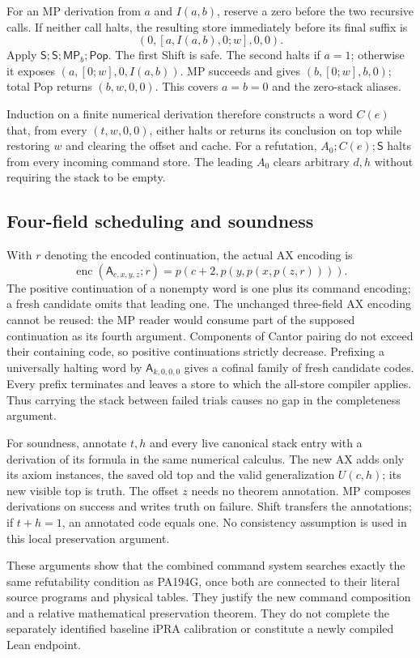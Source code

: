 For an MP derivation from $a$ and $I(a,b)$, reserve a zero before the two
recursive calls. If neither call halts, the resulting store immediately
before its final suffix is
\[
 (0,[a,I(a,b),0;w],0,0).
\]
Apply $\mathsf S;\mathsf S;\mathsf{MP}_b;\mathsf{Pop}$. The first Shift
is safe. The second halts if $a=1$; otherwise it exposes
$(a,[0;w],0,I(a,b))$. MP succeeds and gives $(b,[0;w],b,0)$; total Pop
returns $(b,w,0,0)$. This covers $a=b=0$ and the zero-stack aliases.

Induction on a finite numerical derivation therefore constructs a word
$C(e)$ that, from every $(t,w,0,0)$, either halts or returns its conclusion
on top while restoring $w$ and clearing the offset and cache. For a refutation,
$A_0;C(e);\mathsf S$ halts from every incoming command store. The leading
$A_0$ clears arbitrary $d,h$ without requiring the stack to be empty.

\subsection{Four-field scheduling and soundness}

With $r$ denoting the encoded continuation, the actual AX encoding is
\[
 \operatorname{enc}(\mathsf A_{c,x,y,z};r)
       =p(c+2,p(y,p(x,p(z,r)))).
\]
The positive continuation of a nonempty word is one plus its command
encoding; a fresh candidate omits that leading one. The unchanged
three-field AX encoding cannot be reused: the MP reader would consume part
of the supposed continuation as its fourth argument. Components of Cantor
pairing do not exceed their containing code, so positive continuations
strictly decrease. Prefixing a universally halting word by
$\mathsf A_{k,0,0,0}$ gives a cofinal family of fresh candidate codes.
Every prefix terminates and leaves a store to which the all-store compiler
applies. Thus carrying the stack between failed trials causes no gap in
the completeness argument.

For soundness, annotate $t,h$ and every live canonical stack entry with a
derivation of its formula in the same numerical calculus. The new AX adds
only its axiom instances, the saved old top and the valid generalization
$U(c,h)$; its new visible top is truth. The offset $z$ needs no theorem
annotation. MP composes derivations on success and writes truth on failure.
Shift transfers the annotations; if $t+h=1$, an annotated code equals one.
No consistency assumption is used in this local preservation argument.

These arguments show that the combined command system searches exactly
the same refutability condition as PA194G, once both are connected to their
literal source programs and physical tables. They justify the new command
composition and a relative mathematical preservation theorem. They do not
complete the separately identified baseline iPRA calibration or constitute
a newly compiled Lean endpoint.
